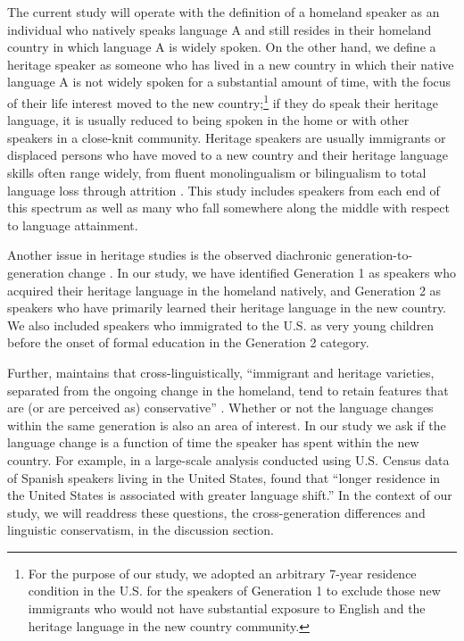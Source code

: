 \documentclass[output=paper,modfonts,newtxmath,hidelinks,]{langscibook}
\begin{document}
The current study will operate with the definition of a homeland speaker as an individual who natively speaks language A and still resides in their homeland country in which language A is widely spoken. On the other hand, we define a heritage speaker as someone who has lived in a new country in which their native language A is not widely spoken for a substantial amount of time, with the focus of their life interest moved to the new country;\footnote{For the purpose of our study, we adopted an arbitrary 7-year residence condition in the U.S. for the speakers of Generation 1 to exclude those new immigrants who would not have substantial exposure to English and the heritage language in the new country community.} if they do speak their heritage language, it is usually reduced to being spoken in the home or with other speakers in a close-knit community. Heritage speakers are usually immigrants or displaced persons who have moved to a new country and their heritage language skills often range widely, from fluent monolingualism or bilingualism to total language loss through attrition \citep{Scontras-etal2015}. This study includes speakers from each end of this spectrum as well as many who fall somewhere along the middle with respect to language attainment.



Another issue in heritage studies is the observed diachronic generation-to-generation change \citep{Otheguy-etal2007}. In our study, we have identified Generation 1 as speakers who acquired their heritage language in the homeland natively, and Generation 2 as speakers who have primarily learned their heritage language in the new country. We also included speakers who immigrated to the U.S. as very young children before the onset of formal education in the Generation 2 category.



Further, \citet{Polinsky2018} maintains that cross-linguistically, “immigrant and heritage varieties, separated from the ongoing change in the homeland, tend to retain features that are (or are perceived as) conservative” \citep[129]{Polinsky2018}. Whether or not the language changes within the same generation is also an area of interest. In our study we ask if the language change is a function of time the speaker has spent within the new country. For example, in a large-scale analysis conducted using U.S. Census data of Spanish speakers living in the United States, \citet{Veltman2000} found that “longer residence in the United States is associated with greater language shift.” \citep[66]{Veltman2000} In the context of our study, we will readdress these questions, the cross-generation differences and linguistic conservatism, in the discussion section.
\end{document}
